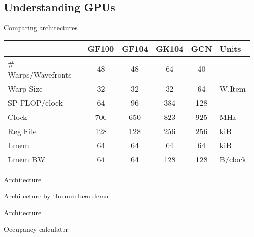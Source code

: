 \documentclass[english,compress]{beamer}
\begin{document}
\subsection{Understanding GPUs}
\begin{frame}{Comparing architectures}
  \begin{tabular}{l|cccc|l}
    & GF100 & GF104 & GK104 & GCN & Units\\
    \hline
    \# Warps/Wavefronts & 48 & 48 & 64 & 40 \\
    Warp Size & 32 & 32 & 32 & 64 & W.Item \\
    \hline
    SP FLOP/clock & 64 & 96 & 384 & 128 \\
    Clock & 700 & 650 & 823 & 925 & MHz \\
    \hline
    Reg File & 128 & 128 & 256 & 256 & kiB \\
    Lmem & 64  & 64 & 64 & 64 & kiB \\
    Lmem BW & 64  & 64 & 128 & 128 & B/clock \\
    \hline
  \end{tabular}
\end{frame}
\begin{frame}{Architecture}
  \begin{center}
  \Huge Architecture by the numbers demo
  \end{center}
\end{frame}
\begin{frame}{Architecture}
  \begin{center}
  \Huge Occupancy calculator
  \end{center}
\end{frame}
\end{document}
